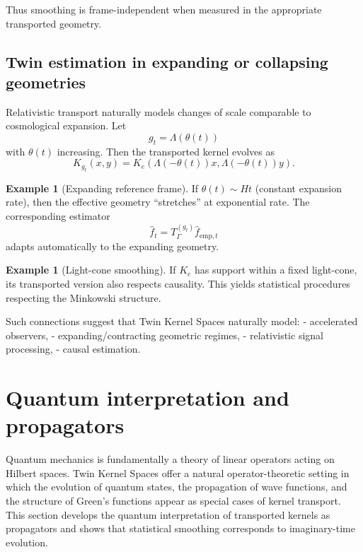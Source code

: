 \documentclass[11pt]{article}
\theoremstyle{definition}
\newtheorem{example}[theorem]{Example}
\begin{document}
	Thus smoothing is frame-independent when measured in the appropriate transported geometry.
	
	\subsection{Twin estimation in expanding or collapsing geometries}
	
	Relativistic transport naturally models changes of scale comparable to cosmological expansion.
	Let
	\[
	g_t=\Lambda(\theta(t))
	\]
	with $\theta(t)$ increasing.
	Then the transported kernel evolves as
	\[
	K_{g_t}(x,y) = K_e(\Lambda(-\theta(t)) x,\Lambda(-\theta(t)) y).
	\]
	
	\begin{example}[Expanding reference frame]
		If $\theta(t)\sim Ht$ (constant expansion rate),
		then the effective geometry “stretches” at exponential rate.
		The corresponding estimator
		\[
		\widehat f_t = T_\Gamma^{(g_t)} \widehat f_{\mathrm{emp},t}
		\]
		adapts automatically to the expanding geometry.
	\end{example}
	
	\begin{example}[Light-cone smoothing]
		If $K_e$ has support within a fixed light-cone, its transported version also respects causality.
		This yields statistical procedures respecting the Minkowski structure.
	\end{example}
	
	Such connections suggest that Twin Kernel Spaces naturally model:
	- accelerated observers,
	- expanding/contracting geometric regimes,
	- relativistic signal processing,
	- causal estimation.
	
	
	
\section{Quantum interpretation and propagators}
\label{sec:quantum}

Quantum mechanics is fundamentally a theory of linear operators acting on Hilbert spaces.
Twin Kernel Spaces offer a natural operator-theoretic setting in which the evolution of quantum states, the propagation of wave functions, and the structure of Green’s functions appear as special cases of kernel transport.
This section develops the quantum interpretation of transported kernels as propagators and shows that statistical smoothing corresponds to imaginary-time evolution.
\end{document}
